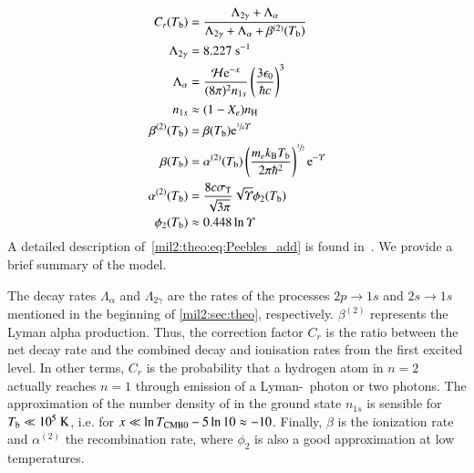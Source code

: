     \begin{subequations}\label{mil2:theo:eq:Peebles_add}
        \begin{align}
            C_r(T_\mathrm{b}) &= \frac{\Lambda_{2\gamma}+ \Lambda_{\alpha}}{\Lambda_{2\gamma} + \Lambda_\alpha + \beta^{(2)}(T_\mathrm{b})} \label{mil2:theo:eq:Peebles_Cr} \\
            \Lambda_{2\gamma} &=8.227~\mathrm{s}^{-1} \label{mil2:theo:eq:Peebles_Lambda_2s1s}  \\
            \Lambda_\alpha &= \frac{\mathcal{H}\mathrm{e}^{-x}}{(8\pi)^2 n_{1s}}\left( \frac{3\epsilon_0}{\hbar c}\right)^3 \label{mil2:theo:eq:Peebles_Lambda_alpha}  \\
            n_{1s} &\approx (1-X_e)n_\mathrm{H}\label{mil2:theo:eq:Peebles_n1s}\\
            \beta^{(2)}(T_\mathrm{b}) &= \beta(T_\mathrm{b})\mathrm{e}^{\sfrac{3}{4}\varUpsilon} \label{mil2:theo:eq:Peebles_beta2} \\
            \beta (T_\mathrm{b}) &= \alpha^{(2)}(T_\mathrm{b}) \left(\frac{m_e k_\mathrm{B} T_\mathrm{b}}{2\pi \hbar^2} \right)^{\sfrac{3}{2}} \mathrm{e}^{-\varUpsilon} \label{mil2:theo:eq:Peebles_beta}  \\
            \alpha^{(2)}(T_\mathrm{b}) &= \frac{8 c\sigma_\mathrm{T} }{\sqrt{3\pi}}\sqrt{\varUpsilon} \phi_2(T_\mathrm{b}) \label{mil2:theo:eq:Peebles_alpha2} \\
            \phi_2(T_\mathrm{b}) &\approx 0.448\ln{\varUpsilon } \label{mil2:theo:eq:Peebles_phi2}
        \end{align}
    \end{subequations}
    A detailed description of~\cref{mil2:theo:eq:Peebles_add} is found in~\citet{Peebles1968}. We provide a brief summary of the model.
    
    The decay rates $\Lambda_\alpha$ and $\Lambda_{2\gamma}$ are the rates of the processes $2p\to 1s$ and $2s\to 1s$ mentioned in the beginning of \cref{mil2:sec:theo}, respectively. $\beta^{(2)}$ represents the Lyman alpha production.
    Thus, the correction factor $C_r$ is the ratio between the net decay rate and the combined decay and ionisation rates from the first excited level. In other terms, $C_r$ is the probability that a hydrogen atom in $n=2$ actually reaches $n=1$ through emission of a Lyman-\textalpha~photon or two photons. The approximation of the number density of  in the ground state $n_{1s}$ is sensible for $T_\mathrm{b}\ll 10^5~\mathrm{K}$, i.e. for $x \ll \ln{T_{\mathrm{CMB}0}} -5\ln{10} \approx -10 $. Finally, $\beta$ is the ionization rate and $\alpha^{(2)}$ the recombination rate, where $\phi_2$ is also a good approximation at low temperatures.~\citep{DodelsonBook,ChungPei1995,Peebles1968}

